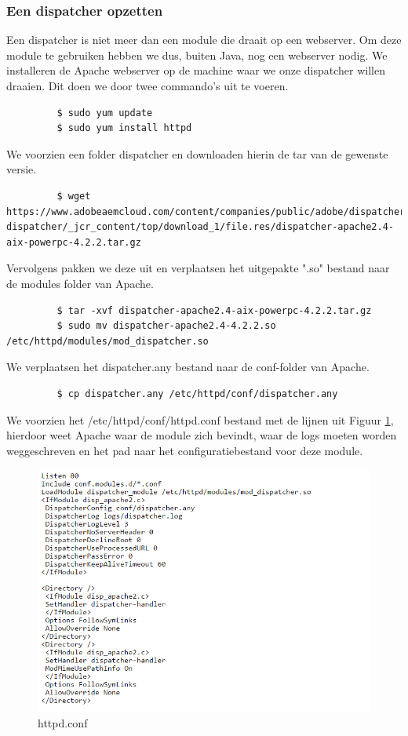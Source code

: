 	\subsubsection{Een dispatcher opzetten}
	Een dispatcher is niet meer dan een module die draait op een webserver. Om deze module te gebruiken hebben we dus, buiten Java, nog een webserver nodig. We installeren de Apache webserver op de machine waar we onze dispatcher willen draaien. Dit doen we door twee commando's uit te voeren.
	\begin{lstlisting}
		 $ sudo yum update
		 $ sudo yum install httpd
	\end{lstlisting}
	We voorzien een folder dispatcher en downloaden hierin de tar van de gewenste versie.
	\begin{lstlisting}
		 $ wget https://www.adobeaemcloud.com/content/companies/public/adobe/dispatcher/		 dispatcher/_jcr_content/top/download_1/file.res/dispatcher-apache2.4-aix-powerpc-4.2.2.tar.gz
	\end{lstlisting}
	Vervolgens pakken we deze uit en verplaatsen het uitgepakte ".so" bestand naar de modules folder van Apache.
	\begin{lstlisting}
		 $ tar -xvf dispatcher-apache2.4-aix-powerpc-4.2.2.tar.gz
		 $ sudo mv dispatcher-apache2.4-4.2.2.so /etc/httpd/modules/mod_dispatcher.so
	\end{lstlisting}
	We verplaatsen het dispatcher.any bestand naar de conf-folder van Apache.
	\begin{lstlisting}
		 $ cp dispatcher.any /etc/httpd/conf/dispatcher.any
	\end{lstlisting}
	We voorzien het /etc/httpd/conf/httpd.conf bestand met de lijnen uit Figuur \ref{fig:httpd-conf}, hierdoor weet Apache waar de module zich bevindt, waar de logs moeten worden weggeschreven en het pad naar het configuratiebestand voor deze module.
	\begin{figure}[h!]
  		\includegraphics[width=\linewidth]{images/httpd-conf.PNG}
  		\caption{httpd.conf}
  		\label{fig:httpd-conf}
	\end{figure}
